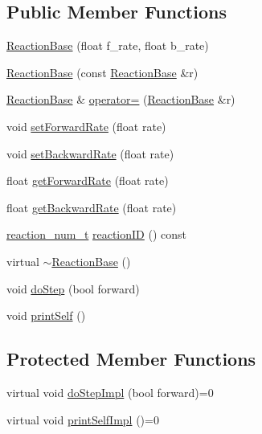 \subsection*{Public Member Functions}
\begin{DoxyCompactItemize}
\item 
\hyperlink{classReactionBase_aa7275024a60197c12df24ea1bd2aeb60}{Reaction\-Base} (float f\-\_\-rate, float b\-\_\-rate)
\item 
\hyperlink{classReactionBase_a49418fa7263de502777bdd1f944ad824}{Reaction\-Base} (const \hyperlink{classReactionBase}{Reaction\-Base} \&r)
\item 
\hyperlink{classReactionBase}{Reaction\-Base} \& \hyperlink{classReactionBase_a338479c4885bf79fd76feb31fb38ce72}{operator=} (\hyperlink{classReactionBase}{Reaction\-Base} \&r)
\item 
void \hyperlink{classReactionBase_a5eda4ba652052d18eac0b716b8b88b89}{set\-Forward\-Rate} (float rate)
\item 
void \hyperlink{classReactionBase_a80ba209fa5e093be83e9d6837f71a76c}{set\-Backward\-Rate} (float rate)
\item 
float \hyperlink{classReactionBase_ab80f5c03018715a4c28b1525757dd7a7}{get\-Forward\-Rate} (float rate)
\item 
float \hyperlink{classReactionBase_a5445e530d298c00512d0f68d3ae46ae1}{get\-Backward\-Rate} (float rate)
\item 
\hyperlink{common_8h_a319d1c064d902ecce241ce6ff8cb3e82}{reaction\-\_\-num\-\_\-t} \hyperlink{classReactionBase_aba0817709465a544738dedeaad5abefb}{reaction\-I\-D} () const 
\item 
virtual \hyperlink{classReactionBase_a57f13fc8a04f01a53e1ead5024c9697a}{$\sim$\-Reaction\-Base} ()
\item 
void \hyperlink{classReactionBase_a9ab134f9395c8f28739bb3964bc35421}{do\-Step} (bool forward)
\item 
void \hyperlink{classReactionBase_a4d690d311c061d9582f91dcccaba0d3c}{print\-Self} ()
\end{DoxyCompactItemize}
\subsection*{Protected Member Functions}
\begin{DoxyCompactItemize}
\item 
virtual void \hyperlink{classReactionBase_adbd7cca78c6b29540aac9b36d9af46ba}{do\-Step\-Impl} (bool forward)=0
\item 
virtual void \hyperlink{classReactionBase_a3d59a31ebbffa9ec979d7a3f8dbe3f7f}{print\-Self\-Impl} ()=0
\end{DoxyCompactItemize}
